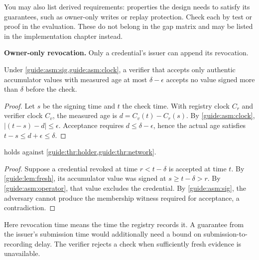You may also list derived requirements: properties the design needs to satisfy its guarantees, such as owner-only writes or replay protection. Check each by test or proof in the evaluation. These do not belong in the gap matrix and may be listed in the implementation chapter instead.
\begin{derivedrequirements}
  \item\label{guide:dr:owner} \textbf{Owner-only revocation.} Only a credential's issuer can append its revocation.
\end{derivedrequirements}

\begin{lemma}\label{guide:lem:fresh}
Under \cref{guide:asm:sig,guide:asm:clock}, a verifier that accepts only authentic accumulator values with measured age at most $\delta-\epsilon$ accepts no value signed more than $\delta$ before the check.
\end{lemma}
\begin{proof}
Let $s$ be the signing time and $t$ the check time. With registry clock $C_r$ and verifier clock $C_v$, the measured age is $d=C_v(t)-C_r(s)$. By \cref{guide:asm:clock}, $|(t-s)-d|\leq\epsilon$. Acceptance requires $d\leq\delta-\epsilon$, hence the actual age satisfies $t-s\leq d+\epsilon\leq\delta$.
\end{proof}
\begin{theorem}\label{guide:thm:stale}
 holds against \cref{guide:thr:holder,guide:thr:network}.
\end{theorem}
\begin{proof}
Suppose a credential revoked at time $r<t-\delta$ is accepted at time $t$. By \cref{guide:lem:fresh}, its accumulator value was signed at $s\geq t-\delta>r$. By \cref{guide:asm:operator}, that value excludes the credential. By \cref{guide:asm:sig}, the adversary cannot produce the membership witness required for acceptance, a contradiction.
\end{proof}
Here revocation time means the time the registry records it. A guarantee from the issuer's submission time would additionally need a bound on submission-to-recording delay. The verifier rejects a check when sufficiently fresh evidence is unavailable.

